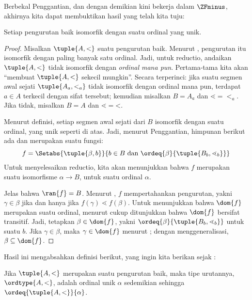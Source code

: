 \documentclass[../../../include/open-logic-section]{subfiles}
\begin{document}

Berbekal Penggantian, dan dengan demikian kini bekerja dalam $\ZFminus$,
akhirnya kita dapat membuktikan hasil yang telah kita tuju:

\begin{thm}
Setiap pengurutan baik isomorfik dengan suatu ordinal yang unik.
\end{thm}

\begin{proof}
Misalkan $\tuple{A, <}$ suatu pengurutan baik. Menurut
, pengurutan itu isomorfik dengan paling banyak
satu ordinal. Jadi, untuk reductio, andaikan $\tuple{A, <}$ tidak isomorfik
dengan \emph{ordinal mana pun}. Pertama-tama kita akan ``membuat
$\tuple{A, <}$ sekecil mungkin''. Secara terperinci: jika suatu segmen awal
sejati $\tuple{A_a, <_a}$ tidak isomorfik dengan ordinal mana pun, terdapat
$a \in A$ terkecil dengan sifat tersebut; kemudian misalkan $B = A_a$ dan
$\mathord{\lessdot} = \mathord{<_a}$. Jika tidak, misalkan $B = A$ dan
$\mathord{\lessdot} = \mathord{<}$.

Menurut definisi, setiap segmen awal sejati dari $B$ isomorfik dengan suatu
ordinal, yang unik seperti di atas. Jadi, menurut Penggantian, himpunan
berikut ada dan merupakan suatu fungsi:
\[
	f = \Setabs{\tuple{\beta, b}}{b \in B\text{ dan }\ordeq{\beta}{\tuple{B_b, \lessdot_b}}}
\]
Untuk menyelesaikan reductio, kita akan menunjukkan bahwa $f$ merupakan
suatu isomorfisme $\alpha \to B$, untuk suatu ordinal $\alpha$.

Jelas bahwa $\ran{f} = B$. Menurut , $f$
mempertahankan pengurutan, yakni $\gamma \in \beta$ jika dan hanya jika
$f(\gamma) \lessdot f(\beta)$. Untuk menunjukkan bahwa $\dom{f}$ merupakan
suatu ordinal, menurut  cukup ditunjukkan
bahwa $\dom{f}$ bersifat transitif. Jadi, tetapkan $\beta \in \dom{f}$,
yakni $\ordeq{\beta}{\tuple{B_b, \lessdot_b}}$ untuk suatu $b$. Jika $\gamma
\in \beta$, maka $\gamma \in \dom{f}$ menurut
; dengan menggeneralisasi, $\beta
\subseteq \dom{f}$.
\end{proof}

Hasil ini mengabsahkan definisi berikut, yang ingin kita berikan sejak
:

\begin{defn}
Jika $\tuple{A, <}$ merupakan suatu pengurutan baik, maka tipe urutannya,
$\ordtype{A, <}$, adalah ordinal unik $\alpha$ sedemikian sehingga
$\ordeq{\tuple{A, < }}{\alpha}$.
\end{defn}
\end{document}
